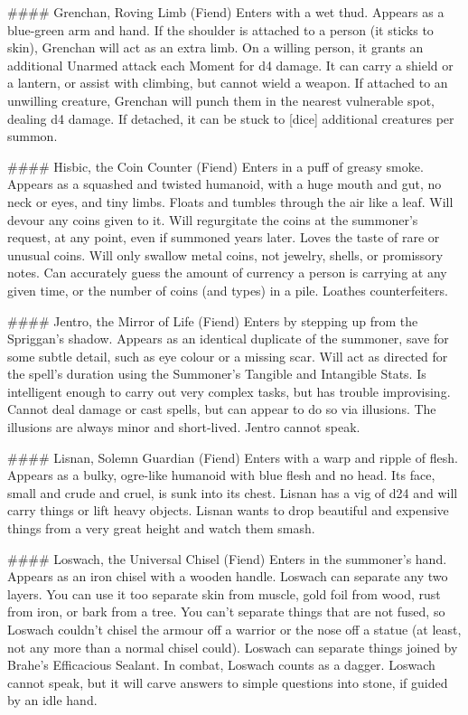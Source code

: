 ####  Grenchan, Roving Limb (Fiend)
Enters with a wet thud. Appears as a blue-green arm and hand. If the shoulder is attached to a person (it sticks to skin), Grenchan will act as an extra limb. On a willing person, it grants an additional Unarmed attack each Moment for d4 damage. It can carry a shield or a lantern, or assist with climbing, but cannot wield a weapon.  If attached to an unwilling creature, Grenchan will punch them in the nearest vulnerable spot, dealing d4 damage. If detached, it can be stuck to [dice] additional creatures per summon. 



####  Hisbic, the Coin Counter (Fiend)
Enters in a puff of greasy smoke. Appears as a squashed and twisted humanoid, with a huge mouth and gut, no neck or eyes, and tiny limbs. Floats and tumbles through the air like a leaf. Will devour any coins given to it. Will regurgitate the coins at the summoner's request, at any point, even if summoned years later. Loves the taste of rare or unusual coins. Will only swallow metal coins, not jewelry, shells, or promissory notes. Can accurately guess the amount of currency a person is carrying at any given time, or the number of coins (and types) in a pile. Loathes counterfeiters. 


####  Jentro, the Mirror of Life (Fiend)
Enters by stepping up from the Spriggan's shadow. Appears as an identical duplicate of the summoner, save for some subtle detail, such as eye colour or a missing scar. Will act as directed for the spell's duration using the Summoner's Tangible and Intangible Stats.  Is intelligent enough to carry out very complex tasks, but has trouble improvising. Cannot deal damage or cast spells, but can appear to do so via illusions. The illusions are always minor and short-lived.  Jentro cannot speak.


####  Lisnan, Solemn Guardian (Fiend)
Enters with a warp and ripple of flesh. Appears as a bulky, ogre-like humanoid with blue flesh and no head. Its face, small and crude and cruel, is sunk into its chest. Lisnan has a {vig} of d24 and will carry things or lift heavy objects. Lisnan wants to drop beautiful and expensive things from a very great height and watch them smash.


####  Loswach, the Universal Chisel (Fiend)
Enters in the summoner's hand. Appears as an iron chisel with a wooden handle. Loswach can separate any two layers. You can use it too separate skin from muscle, gold foil from wood, rust from iron, or bark from a tree. You can't separate things that are not fused, so Loswach couldn't chisel the armour off a warrior or the nose off a statue (at least, not any more than a normal chisel could). Loswach can separate things joined by Brahe's Efficacious Sealant.  In combat, Loswach counts as a dagger. Loswach cannot speak, but it will carve answers to simple questions into stone, if guided by an idle hand.




